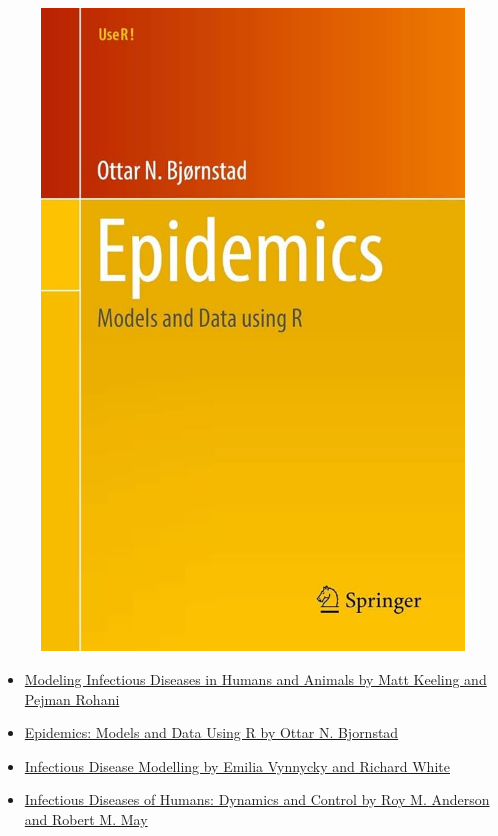 \documentclass[
  ignorenonframetext,
]{beamer}
\begin{document}
\begin{frame}
\begin{figure}
\begin{minipage}{0.50\linewidth}
\includegraphics{images/Epidemics_Ottar.jpg}\end{minipage}%

\end{figure}%
\end{frame}

\begin{frame}
\begin{itemize}
\item
  \href{https://www.amazon.co.uk/Modeling-Infectious-Diseases-Humans-Animals/dp/0691116172}{Modeling
  Infectious Diseases in Humans and Animals by Matt Keeling and Pejman
  Rohani}
\item
  \href{https://link.springer.com/book/10.1007/978-3-031-12056-5}{Epidemics:
  Models and Data Using R by Ottar N. Bjornstad}
\item
  \href{https://www.amazon.co.uk/Introduction-Infectious-Disease-Modelling/dp/0198565763}{Infectious
  Disease Modelling by Emilia Vynnycky and Richard White}
\item
  \href{https://www.amazon.co.uk/Infectious-Diseases-Humans-Dynamics-Control/dp/019854040X}{Infectious
  Diseases of Humans: Dynamics and Control by Roy M. Anderson and Robert
  M. May}
\end{itemize}
\end{frame}
\end{document}
